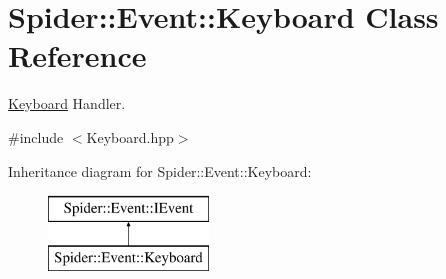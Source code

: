 \hypertarget{class_spider_1_1_event_1_1_keyboard}{}\section{Spider\+:\+:Event\+:\+:Keyboard Class Reference}
\label{class_spider_1_1_event_1_1_keyboard}


\hyperlink{class_spider_1_1_event_1_1_keyboard}{Keyboard} Handler.  




{\ttfamily \#include $<$Keyboard.\+hpp$>$}

Inheritance diagram for Spider\+:\+:Event\+:\+:Keyboard\+:\begin{figure}[H]
\begin{center}
\leavevmode
\includegraphics[height=2.000000cm]{class_spider_1_1_event_1_1_keyboard}
\end{center}
\end{figure}
